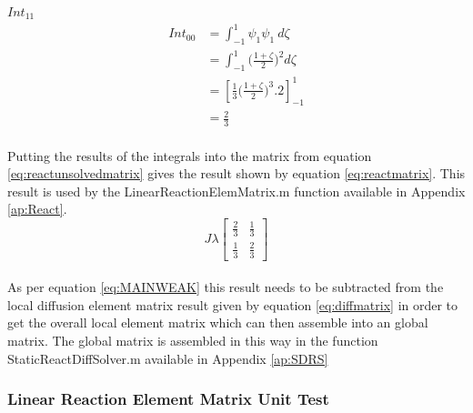 \documentclass[11pt]{article}
\begin{document}
\underline{$Int_{11}$} \\
\begin{equation}\label{eq:Int00}
\begin{split}
 Int_{00} &= \int_{-1}^{1} \psi_{1}\psi_{1} \ d \zeta \\
&=  \int_{-1}^{1}  \Big ( \frac{1+\zeta}{2} \Big )^2 d\zeta \\
& = \left[ \frac{1}{3} \Big ( \frac{1+\zeta}{2}\Big)^3 . 2 \right]_{-1}^{1} \\
& = \frac{2}{3}
\end{split}
\end{equation} \\

Putting the results of the integrals into the matrix from equation \ref{eq:reactunsolvedmatrix} gives the result shown by equation \ref{eq:reactmatrix}. This result is used by the LinearReactionElemMatrix.m function available in Appendix \ref{ap:React}.\\


\begin{equation} \label{eq:reactmatrix}
J\lambda
\begin{bmatrix}

\frac{2}{3} & \frac{1}{3}  \\[1ex]
 \frac{1}{3}  & \frac{2}{3}
\end{bmatrix}
\end{equation}\\

 As per equation \ref{eq:MAINWEAK} this result needs to be subtracted from the local diffusion element matrix result given by equation \ref{eq:diffmatrix} in order to get the overall local element matrix which can then assemble into an global matrix. The global matrix is assembled in this way in the function StaticReactDiffSolver.m available in Appendix \ref{ap:SDRS}

\subsubsection{Linear Reaction Element Matrix Unit Test}
\end{document}
